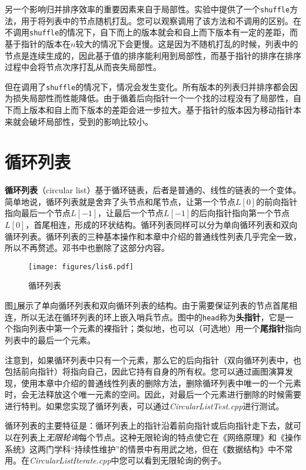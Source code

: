 另一个影响归并排序效率的重要因素来自于局部性。实验中提供了一个\lstinline{shuffle}方法，用于将列表中的节点随机打乱。您可以观察调用了该方法和不调用的区别。在不调用\lstinline{shuffle}的情况下，自下而上的版本就会和自上而下版本有一定的差距，而基于指针的版本在$n$较大的情况下会更慢。这是因为不随机打乱的时候，列表中的节点是连续生成的，因此基于值的排序能利用到局部性，而基于指针的排序在排序过程中会将节点次序打乱从而丧失局部性。

但在调用了\lstinline{shuffle}的情况下，情况会发生变化。所有版本的列表归并排序都会因为损失局部性而性能降低。由于循着后向指针一个一个找的过程没有了局部性，自下而上版本和自上而下版本的差距会进一步拉大。基于指针的版本因为移动指针本来就会破坏局部性，受到的影响比较小。

\section{循环列表}

\textbf{循环列表}（circular list）基于循环链表，后者是普通的、线性的链表的一个变体。简单地说，循环列表就是舍弃了头节点和尾节点，让第一个节点$L[0]$的前向指针指向最后一个节点$L[-1]$，让最后一个节点$L[-1]$的后向指针指向第一个节点$L[0]$，首尾相连，形成的环状结构。循环列表同样可以分为单向循环列表和双向循环列表。循环列表的三种基本操作和本章中介绍的普通线性列表几乎完全一致，所以不再赘述。邓书中也删除了这部分内容。

\begin{figure}
  \centering
  \texttt{[image: figures/lis6.pdf]}
  \caption{循环列表}
  \label{fig:lis6}
\end{figure}

图\ref{fig:lis6}展示了单向循环列表和双向循环列表的结构。由于需要保证列表的节点首尾相连，所以无法在循环列表的环上嵌入哨兵节点。图中的\lstinline{head}称为\textbf{头指针}，它是一个指向列表中第一个元素的裸指针；类似地，也可以（可选地）用一个\textbf{尾指针}指向列表中的最后一个元素。

注意到，如果循环列表中只有一个元素，那么它的后向指针（双向循环列表中，也包括前向指针）将指向自己，因此它持有自身的所有权。您可以通过画图演算发现，使用本章中介绍的普通线性列表的删除方法，删除循环列表中唯一的一个元素时，会无法释放这个唯一元素的空间。因此，对最后一个元素进行删除的时候需要进行特判。如果您实现了循环列表，可以通过\textit{CircularListTest.cpp}进行测试。

循环列表的主要特征是：循环列表上的指针沿着前向指针或后向指针走下去，就可以在列表上\textit{无限轮询}每个节点。这种无限轮询的特点使它在《网络原理》和《操作系统》这两门学科“持续性维护”的情景中有用武之地，但在《数据结构》中不常用。在\textit{CircularListIterate.cpp}中您可以看到无限轮询的例子。

